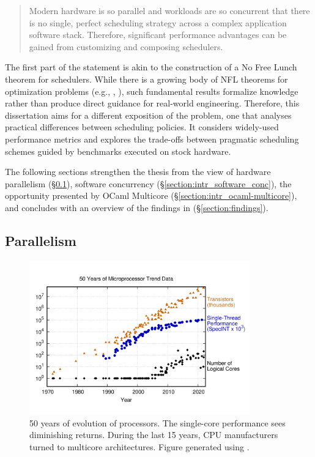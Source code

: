 \documentclass[12pt,a4paper,twoside]{report}
\begin{document}
\begin{quote}
    Modern hardware is so parallel and workloads are so concurrent that there is no single, perfect scheduling strategy across a complex application software stack. Therefore, significant performance advantages can be gained from customizing and composing schedulers.
\end{quote} 

The first part of the statement is akin to the construction of a No Free Lunch theorem \cite{Ho2002} for schedulers. While there is a growing body of NFL theorems for optimization problems (e.g., \cite{Wolpert1997}, \cite{Igel2005}), such fundamental results formalize knowledge rather than produce direct guidance for real-world engineering. Therefore, this dissertation aims for a different exposition of the problem, one that analyses practical differences between scheduling policies. It considers widely-used performance metrics and explores the trade-offs between pragmatic scheduling schemes guided by benchmarks executed on stock hardware. 

The following sections strengthen the thesis from the view of hardware parallelism (\S\ref{section:intr_hardware_par}), software concurrency (\S\ref{section:intr_software_conc}), the opportunity presented by OCaml Multicore (\S\ref{section:intr_ocaml-multicore}), and concludes with an overview of the findings in (\S\ref{section:findings}).

\subsection{Parallelism}
\label{section:intr_hardware_par}


\begin{figure}[t]
    \centering
    \includegraphics[width=0.85\textwidth]{50-years-processor-trend.png}
    \caption{50 years of evolution of processors. The single-core performance sees diminishing returns. During the last 15 years, CPU manufacturers turned to multicore architectures. Figure generated using \cite{karlrupp48:online}.}
   \label{fig:50yrs}
\end{figure}
\end{document}

